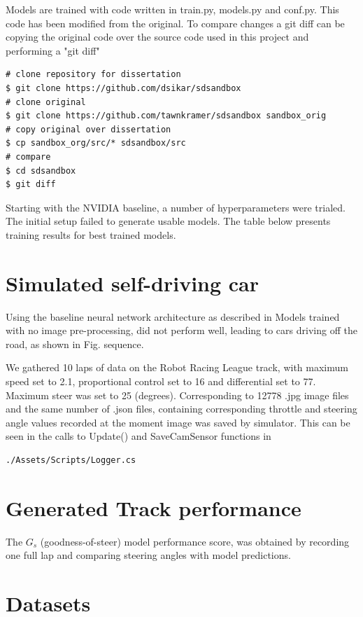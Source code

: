 Models are trained with code written in train.py, models.py and conf.py. This code has been modified from the original. To compare changes a git diff can be copying the original code over the source code used in this project and performing a "git diff"
\begin{verbatim}
# clone repository for dissertation
$ git clone https://github.com/dsikar/sdsandbox
# clone original
$ git clone https://github.com/tawnkramer/sdsandbox sandbox_orig
# copy original over dissertation
$ cp sandbox_org/src/* sdsandbox/src
# compare
$ cd sdsandbox 
$ git diff
\end{verbatim}


Starting with the NVIDIA baseline, a number of hyperparameters were trialed. The initial setup failed to generate usable models. 
The table below presents training results for best trained models.


\section{Simulated self-driving car}

Using the baseline neural network architecture as described in 
Models trained with no image pre-processing, did not perform well, leading to cars driving off the road, as shown in Fig.  sequence.

We gathered 10 laps of data on the Robot Racing League track, with maximum speed set to 2.1, proportional control set to 16 and differential set to 77. Maximum steer was set to 25 (degrees). Corresponding to 12778 .jpg image files and the same number of  .json files, containing corresponding throttle and steering angle values recorded at the moment image was saved by simulator. This can be seen in the calls to Update() and SaveCamSensor functions in  
\begin{verbatim}
./Assets/Scripts/Logger.cs
\end{verbatim}

\section{Generated Track performance}


The $G_s$ (goodness-of-steer) model performance score, was obtained by recording one full lap and comparing steering angles with model predictions.

\section{Datasets}

